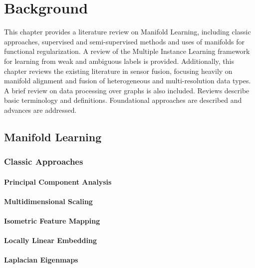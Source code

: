 \chapter{Background}

This chapter provides a literature review on Manifold Learning, including classic approaches, supervised and semi-supervised methods and uses of manifolds for functional regularization.  A review of the Multiple Instance Learning framework for learning from weak and ambiguous labels is provided. Additionally, this chapter reviews the existing literature in sensor fusion, focusing heavily on manifold alignment and fusion of heterogeneous and multi-resolution data types.  A brief review on data processing over graphs is also included.  Reviews describe basic terminology and definitions.  Foundational approaches are described and advances are addressed.

\section{Manifold Learning}

	
	

\subsection{Classic Approaches}

	\subsubsection{Principal Component Analysis}
	
	\subsubsection{Multidimensional Scaling}
	
	\subsubsection{Isometric Feature Mapping}
	
	\subsubsection{Locally Linear Embedding}
	
	\subsubsection{Laplacian Eigenmaps}
	

